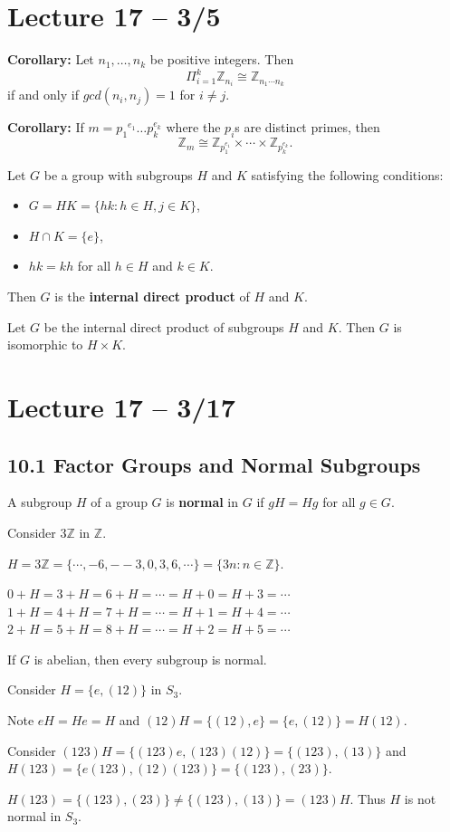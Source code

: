 \documentclass{article}
\newcommand{\Z}{\mathbb{Z}}
\begin{document}
\section{Lecture 17 -- 3/5}
\textbf{Corollary:} Let $n_1, \dots,n_k$ be positive integers. Then
\[\Pi_{i=1}^k \Z_{n_i}\cong \Z_{n_1\cdots n_k}\]
if and only if $gcd(n_i,n_j)=1$ for $i\neq j$.

\textbf{Corollary:} If $m={p_1}^{e_1}\dots p_k^{e_k}$ where the $p_i$s are distinct primes, then
\[\Z_m\cong\Z_{p_1^{e_1}}\times\cdots\times\Z_{p_k^{e_k}}.\]

\begin{definition}
  Let $G$ be a group with subgroups $H$ and $K$ satisfying the following conditions:
  \begin{itemize}
    \item $G=HK=\{hk:h\in H,j\in K\}$,
    \item $H\cap K=\{e\}$,
    \item $hk=kh$ for all $h\in H$ and $k\in K$.
  \end{itemize}
  Then $G$ is the \textbf{internal direct product} of $H$ and $K$.
\end{definition}

\begin{theorem}
  Let $G$ be the internal direct product of subgroups $H$ and $K$. Then $G$ is isomorphic to $H\times K$.
\end{theorem}
\section{Lecture 17 -- 3/17}
\subsection{10.1 Factor Groups and Normal Subgroups}
A subgroup $H$ of a group $G$ is \textbf{normal} in $G$ if $gH=Hg$ for all $g\in G$.
\begin{example}
  Consider $3\Z$ in $\Z$.

  $H=3\Z=\{\cdots,-6,--3,0,3,6,\cdots\}=\{3n:n\in\Z\}.$

  $0+H=3+H=6+H=\cdots=H+0=H+3=\cdots$
  $1+H=4+H=7+H=\cdots=H+1=H+4=\cdots$
  $2+H=5+H=8+H=\cdots=H+2=H+5=\cdots$

  If $G$ is abelian, then every subgroup is normal.

\end{example}

\begin{example}
  Consider $H = \{e, (12)\}$ in $S_3$.

  Note $eH=He=H$ and $(12)H=\{(12), e\}=\{e, (12)\}=H(12)$.

  Consider $(123)H=\{(123)e, (123)(12)\}=\{(123), (13)\}$ and $H(123)=\{e(123), (12)(123)\}=\{(123), (23)\}$.

  $H(123)=\{(123), (23)\}\neq\{(123), (13)\}=(123)H$. Thus $H$ is not normal in $S_3$.
\end{example}
\end{document}
